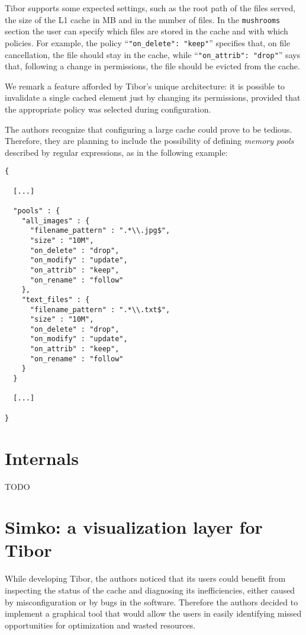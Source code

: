 \documentclass[conference,compsoc]{IEEEtran}
\begin{document}
Tibor supports some expected settings, such as the root path of the files
served, the size of the L1 cache in MB and in the number of files. In the
\texttt{mushrooms} section the user can specify which files are stored in the
cache and with which policies. For example, the policy ``\texttt{"on\_delete":
"keep"}'' specifies that, on file cancellation, the file should stay in the
cache, while ``\texttt{"on\_attrib": "drop"}'' says that, following a change in
permissions, the file should be evicted from the cache.

We remark a feature afforded by Tibor's unique architecture: it is possible to
invalidate a single cached element just by changing its permissions, provided
that the appropriate policy was selected during configuration.

The authors recognize that configuring a large cache could prove to be tedious.
Therefore, they are planning to include the possibility of defining \emph{memory pools}
described by regular expressions, as in the following example:

\begin{verbatim}
{

  [...]

  "pools" : {
    "all_images" : {
      "filename_pattern" : ".*\\.jpg$", 	
      "size" : "10M", 
      "on_delete" : "drop",		
      "on_modify" : "update",
      "on_attrib" : "keep",
      "on_rename" : "follow"
    },
    "text_files" : {
      "filename_pattern" : ".*\\.txt$", 
      "size" : "10M",
      "on_delete" : "drop",		
      "on_modify" : "update",
      "on_attrib" : "keep",
      "on_rename" : "follow"
    }
  }

  [...]

}
\end{verbatim}

\section{Internals}
TODO

\section{Simko: a visualization layer for Tibor}
While developing Tibor, the authors noticed that its users could benefit from
inspecting the status of the cache and diagnosing its inefficiencies, either
caused by misconfiguration or by bugs in the software. Therefore the authors
decided to implement a graphical tool that would allow the users in easily
identifying missed opportunities for optimization and wasted resources.
\end{document}
